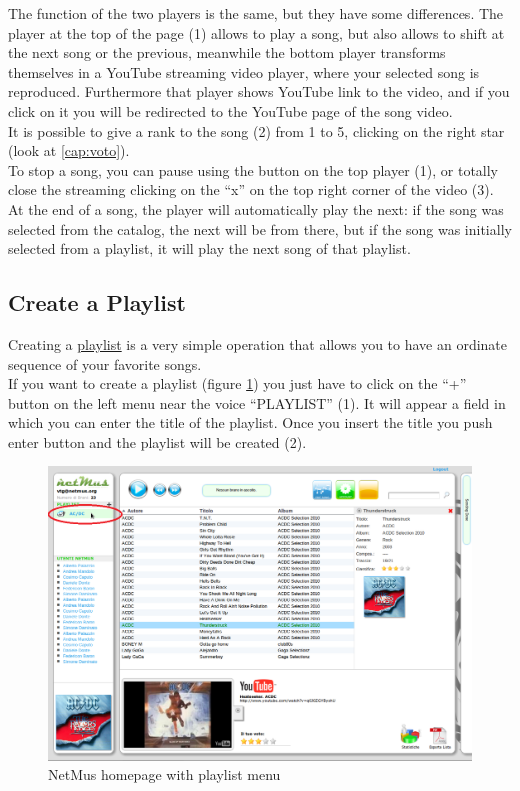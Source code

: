 The function of the two players is the same, but they have some differences.
The player at the top of the page (1) allows to play a song, but also
allows to shift at the next song or the previous, meanwhile the bottom player
transforms themselves in a YouTube streaming video player, where your selected song
is reproduced. Furthermore that player shows YouTube link to the video, and if
you click on it you will be redirected to the YouTube page of the song video.\\
It is possible to give a rank to the song (2) from 1 to 5, clicking on the right
star (look at \ref{cap:voto}).\\

To stop a song, you can pause using the button on the top player (1), or totally
close the streaming clicking on the ``x'' on the top right corner of the video
(3).\\

At the end of a song, the player will automatically play the next: if the song
was selected from the catalog, the next will be from there, but if the song was
initially selected from a playlist, it will play the next song of that
playlist.\\

\subsection{Create a Playlist}

Creating a \underline{playlist} is a very simple operation that allows you to
have an ordinate sequence of your favorite songs.\\
If you want to create a playlist (figure \ref{fig:playlist}) you just have to
click on the ``+'' button on the left menu near the voice ``PLAYLIST'' (1). It
will appear a field in which you can enter the title of the playlist. Once you insert the title you push
enter button and the playlist will be created (2).\\

\begin{figure}[!htbp]
  \centering
  \includegraphics[width=15cm]{img/MU/new_playlist.png}
\caption{NetMus homepage with playlist menu}
\label{fig:playlist}
\end{figure}

